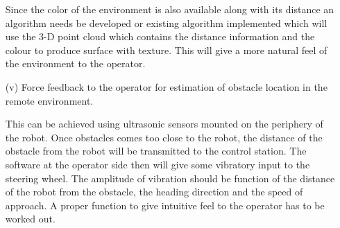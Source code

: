 \begin{itemize}
	Since the color of the environment is also available along with its distance an algorithm needs be  developed or existing algorithm implemented   which will use the 3-D point cloud which contains the distance information  and the colour to produce surface with texture.  This will give a more natural feel of the environment to the operator.
	
	
	\item [(v)] Force feedback to the operator for estimation of obstacle location in the remote environment.  
	
	This can be achieved using ultrasonic sensors mounted on the periphery of the robot. Once obstacles comes too close to the robot, the distance of the obstacle from the robot will be transmitted to the control station. The software at the operator side then will give some vibratory input to the steering wheel. The amplitude of vibration should be function of the distance of the robot from the obstacle, the heading direction and the speed of approach. A proper function to give intuitive feel to the operator has to be worked out.
\end{itemize}	
